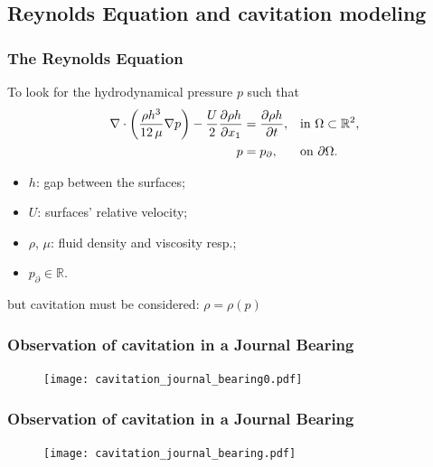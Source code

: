 \documentclass[10pt,aspectratio=169]{beamer}
\begin{document}
\subsection{Reynolds Equation and cavitation modeling}


\begin{frame}
\frametitle{The Reynolds Equation}\bigskip
To look for the hydrodynamical pressure $p$ such that
\begin{align*}
\nabla \cdot \left( \frac{\rho h^3}{12\,\mu} \nabla p \right)- \frac{U}{2}\frac{\partial \rho h }{\partial x_1} &=\frac{\partial \rho h }{\partial t}, &&\text{in } \Omega\subset \mathbb{R}^2,\\
p&=p_\partial,&&\text{on } \partial \Omega.
\end{align*} 
\begin{itemize}
	\item $h$: gap between the surfaces;
	\item $U$: surfaces' relative velocity;
	\item $\rho$, $\mu$: fluid density and viscosity resp.;
	\item $p_\partial\in \mathbb{R}$.
\end{itemize}

\begin{center}
	but cavitation must be considered: $\rho=\rho(p)$
\end{center}
\end{frame}


\begin{frame}
\frametitle{Observation of cavitation in a Journal Bearing}
\vspace*{1.0cm}
\begin{figure}
	\centering
	\texttt{[image: cavitation\_journal\_bearing0.pdf]}
\end{figure}
\end{frame}


\begin{frame}[noframenumbering]
\frametitle{Observation of cavitation in a Journal Bearing}
\vspace*{1.0cm}
\begin{figure}
	\centering
	\texttt{[image: cavitation\_journal\_bearing.pdf]}
\end{figure}
\end{frame}
\end{document}
